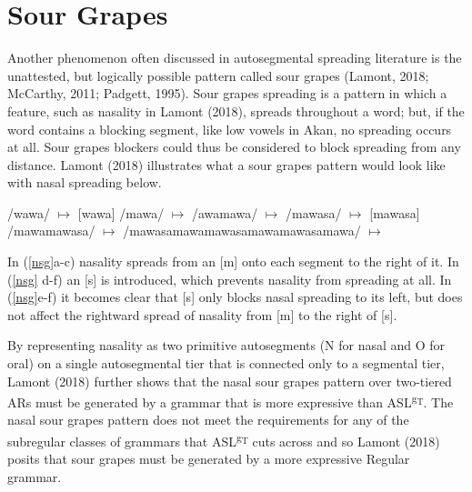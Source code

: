 \documentclass[,doc,floatsintext]{apa6}
\theoremstyle{definition}
\theoremstyle{definition}
\theoremstyle{definition}
\theoremstyle{remark}
\begin{document}
\section{Sour Grapes}\label{sour-grapes}

Another phenomenon often discussed in autosegmental spreading literature
is the unattested, but logically possible pattern called sour grapes
(Lamont, 2018; McCarthy, 2011; Padgett, 1995). Sour grapes spreading is
a pattern in which a feature, such as nasality in Lamont (2018), spreads
throughout a word; but, if the word contains a blocking segment, like
low vowels in Akan, no spreading occurs at all. Sour grapes blockers
could thus be considered to block spreading from any distance. Lamont
(2018) illustrates what a sour grapes pattern would look like with nasal
spreading below.

\begin{exe}
\label{nsg} 
\begin{xlist}
  \ex /wawa/ $\mapsto$ [wawa]
  \ex /mawa/ $\mapsto$ \textipa{[m\~a\~w\~a]}
  \ex /awamawa/ $\mapsto$ \textipa{[awam\~a\~w\~a]}
  \ex /mawasa/ $\mapsto$ [mawasa]
  \ex /mawamawasa/ $\mapsto$ \textipa{[m\~a\~w\~amawasa]}
  \ex /mawasamawamawasamawamawasamawa/ $\mapsto$ 
\end{xlist}
\end{exe}

\noindent In (\ref{nsg}a-c) nasality spreads from an {[}m{]} onto each
segment to the right of it. In (\ref{nsg} d-f) an {[}s{]} is introduced,
which prevents nasality from spreading at all. In (\ref{nsg}e-f) it
becomes clear that {[}s{]} only blocks nasal spreading to its left, but
does not affect the rightward spread of nasality from {[}m{]} to the
right of {[}s{]}.

By representing nasality as two primitive autosegments (N for nasal and
O for oral) on a single autosegmental tier that is connected only to a
segmental tier, Lamont (2018) further shows that the nasal sour grapes
pattern over two-tiered ARs must be generated by a grammar that is more
expressive than ASL\textsuperscript{g\textsubscript{T}}. The nasal sour
grapes pattern does not meet the requirements for any of the subregular
classes of grammars that ASL\textsuperscript{g\textsubscript{T}} cuts
across and so Lamont (2018) posits that sour grapes must be generated by
a more expressive Regular grammar.
\end{document}
